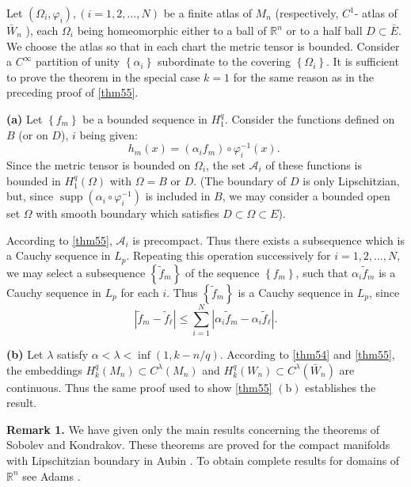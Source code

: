 \documentclass[12pt,hyperref,a4paper,UTF8]{ctexart}
\begin{document}
\begin{Proof}
    Let $\left(\Omega_i, \varphi_i\right),(i=1,2, \ldots, N)$ be a finite atlas of $M_n$ (respectively, $C^1$- atlas of $\bar{W}_n$ ), each $\Omega_i$ being homeomorphic either to a ball of $\mathbb{R}^n$ or to a half ball $D \subset \bar{E}$. We choose the atlas so that in each chart the metric tensor is bounded. Consider a $C^{\infty}$ partition of unity $\left\{\alpha_i\right\}$ subordinate to the covering $\left\{\Omega_i\right\}$. It is sufficient to prove the theorem in the special case $k=1$ for the same reason as in the preceding proof of \autoref{thm55}.

    \vskip 10pt
    \textbf{(a)} Let $\left\{f_m\right\}$ be a bounded sequence in $H_1^q$. Consider the functions defined on $B$ (or on $D$), $i$ being given:
$$
h_m(x)=\left(\alpha_i f_m\right) \circ \varphi_i^{-1}(x) \text {. }
$$
Since the metric tensor is bounded on $\Omega_i$, the set $\mathcal{A}_i$ of these functions is bounded in $H_1^q(\Omega)$ with $\Omega=B$ or $D$. (The boundary of $D$ is only Lipschitzian, but, since $\operatorname{supp}\left(\alpha_i \circ \varphi_i^{-1}\right)$ is included in $B$, we may consider a bounded open set $\Omega$ with smooth boundary which satisfies $D \subset \Omega \subset E$).

\noindent
According to \autoref{thm55}, $\mathcal{A}_i$ is precompact. Thus there exists a subsequence which is a Cauchy sequence in $L_p$. Repeating this operation successively for $i=1,2, \ldots, N$, we may select a subsequence $\left\{\tilde{f}_m\right\}$ of the sequence $\left\{f_m\right\}$, such that $\alpha_i \tilde{f}_m$ is a Cauchy sequence in $L_p$ for each $i$. Thus $\left\{\tilde{f}_m\right\}$ is a Cauchy sequence in $L_p$, since
$$
\left|\tilde{f}_m-\tilde{f}_{\ell}\right| \leq \sum_{i=1}^N\left|\alpha_i \tilde{f}_m-\alpha_i \tilde{f}_{\ell}\right| .
$$

\vskip 10pt
\textbf{(b)} Let $\lambda$ satisfy $\alpha<\lambda<\inf (1, k-n / q)$. According to \autoref{thm54} and \autoref{thm55}, the embeddings $H_k^q\left(M_n\right) \subset C^\lambda\left(M_n\right)$ and $H_k^q\left(W_n\right) \subset C^\lambda\left(\bar{W}_n\right)$ are continuous. Thus the same proof used to show \autoref{thm55} $\mathrm{(b)}$  establishes the result.
\end{Proof}

\vskip 10pt
\textbf{Remark 1.} We have given only the main results concerning the theorems of Sobolev and Kondrakov. These theorems are proved for the compact manifolds with Lipschitzian boundary in Aubin \cite{Aubin-}. To obtain complete results for domains of $\mathbb{R}^n$ see Adams \cite{A}.
\end{document}

